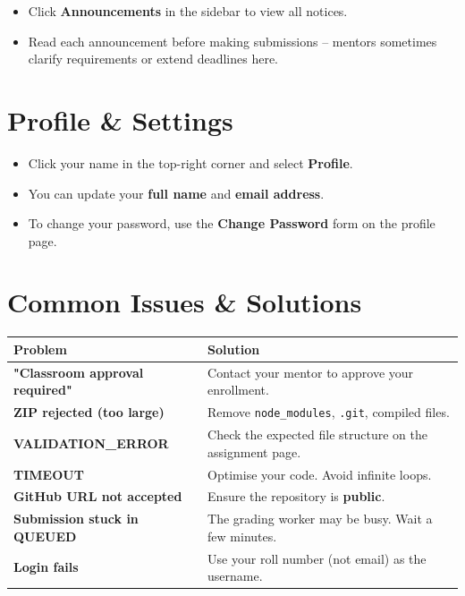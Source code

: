 \documentclass[12pt,a4paper]{article}
\begin{document}
\begin{itemize}
  \item Click \textbf{Announcements} in the sidebar to view all notices.
  \item Read each announcement before making submissions -- mentors sometimes clarify requirements or extend deadlines here.
\end{itemize}

\section{Profile \& Settings}

\begin{itemize}
  \item Click your name in the top-right corner and select \textbf{Profile}.
  \item You can update your \textbf{full name} and \textbf{email address}.
  \item To change your password, use the \textbf{Change Password} form on the profile page.
\end{itemize}

\section{Common Issues \& Solutions}

\begin{center}
\begin{tabularx}{\linewidth}{>{\bfseries}lX}
\toprule
Problem & Solution \\
\midrule
"Classroom approval required" & Contact your mentor to approve your enrollment. \\
ZIP rejected (too large)       & Remove \texttt{node\_modules}, \texttt{.git}, compiled files. \\
VALIDATION\_ERROR               & Check the expected file structure on the assignment page. \\
TIMEOUT                        & Optimise your code. Avoid infinite loops. \\
GitHub URL not accepted        & Ensure the repository is \textbf{public}. \\
Submission stuck in QUEUED     & The grading worker may be busy. Wait a few minutes. \\
Login fails                    & Use your roll number (not email) as the username. \\
\bottomrule
\end{tabularx}
\end{center}
\end{document}
